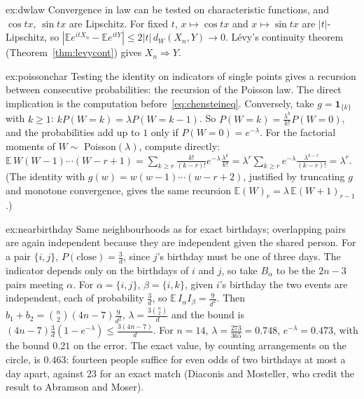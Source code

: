 \begin{solution}{ex:dwlaw}
\idea Convergence in law can be tested on characteristic functions, and $\cos tx$, $\sin tx$ are Lipschitz.
\writeup For fixed $t$, $x\mapsto\cos tx$ and $x\mapsto\sin tx$ are $|t|$-Lipschitz, so $|\mathbb Ee^{itX_n}-\mathbb Ee^{itY}|\le2|t|\,d_W(X_n,Y)\to0$. L\'evy's continuity theorem
(Theorem~\ref{thm:levycont}) gives $X_n\Rightarrow Y$.
\end{solution}

\begin{solution}{ex:poissonchar}
\idea Testing the identity on indicators of single points gives a recursion between consecutive probabilities: the recursion of the Poisson law.
\writeup The direct implication is the computation before~\eqref{eq:chensteineq}. Conversely, take $g=\mathbf 1_{\{k\}}$ with $k\ge1$: $kP(W=k)=\lambda P(W=k-1)$. So
$P(W=k)=\frac{\lambda^k}{k!}P(W=0)$, and the probabilities add up to $1$ only if $P(W=0)=e^{-\lambda}$. For the factorial moments of $W\sim$ Poisson$(\lambda)$, compute
directly: $\mathbb E\,W(W-1)\cdots(W-r+1)=\sum_{k\ge r}\frac{k!}{(k-r)!}e^{-\lambda}\frac{\lambda^k}{k!}=\lambda^r\sum_{k\ge r}e^{-\lambda}\frac{\lambda^{k-r}}{(k-r)!}=\lambda^r$. (The identity with
$g(w)=w(w-1)\cdots(w-r+2)$, justified by truncating $g$ and monotone convergence, gives the same recursion $\mathbb E(W)_r=\lambda\,\mathbb E(W+1)_{r-1}$.)
\end{solution}

\begin{solution}{ex:nearbirthday}
\idea Same neighbourhoods as for exact birthdays; overlapping pairs are again independent because they are independent given the shared person.
\writeup For a pair $\{i,j\}$, $P(\text{close})=\frac3d$, since $j$'s birthday must be one of three days. The indicator depends only on the birthdays of $i$ and $j$, so take
$B_\alpha$ to be the $2n-3$ pairs meeting $\alpha$. For $\alpha=\{i,j\}$, $\beta=\{i,k\}$, given $i$'s birthday the two events are independent, each of probability $\frac3d$,
so $\mathbb E\,I_\alpha I_\beta=\frac9{d^2}$. Then $b_1+b_2=\binom n2(4n-7)\frac9{d^2}$, $\lambda=\frac{3\binom n2}d$ and the bound is $(4n-7)\frac3d(1-e^{-\lambda})\le\frac{3(4n-7)}d$.
For $n=14$, $\lambda=\frac{273}{365}=0.748$, $e^{-\lambda}=0.473$, with the bound $0.21$ on the error. The exact value, by counting arrangements on the circle, is
$0.463$: fourteen people suffice for even odds of two birthdays at most a day apart, against $23$ for an exact match (Diaconis and Mosteller, who credit the
result to Abramson and Moser).
\end{solution}

